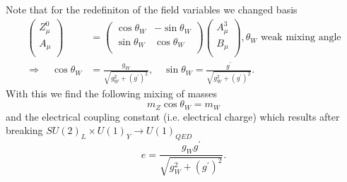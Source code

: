 Note that for the redefiniton of the field variables we changed basis
\begin{align}
	\begin{pmatrix}
		Z^0_\mu \\
		A_\mu \\
	\end{pmatrix}&=
	\begin{pmatrix}
		\cos \theta_W & - \sin \theta_W \\
		\sin \theta_W & \cos \theta_W \\
	\end{pmatrix}
	\begin{pmatrix}
		A^3_\mu \\
		B_\mu \\
	\end{pmatrix}, \theta_W \text{ weak mixing angle}\\
	\Rightarrow \quad \cos \theta_W &= \frac{g_W}{\sqrt{g^2_W+(g^\prime)^2}}, \quad \sin \theta_W = \frac{g^\prime}{\sqrt{g^2_W+(g^\prime)^2}}.
\end{align}
With this we find the following mixing of masses
\begin{equation}
m_Z \cos\theta_W = m_W
\end{equation}
and the electrical coupling constant (i.e. electrical charge) which results after breaking $SU(2)_L\times U(1)_Y \rightarrow U(1)_{QED}$
\begin{equation}
e = \frac{g_W g^\prime}{\sqrt{g^2_W+(g^\prime)^2}}.
\end{equation}
